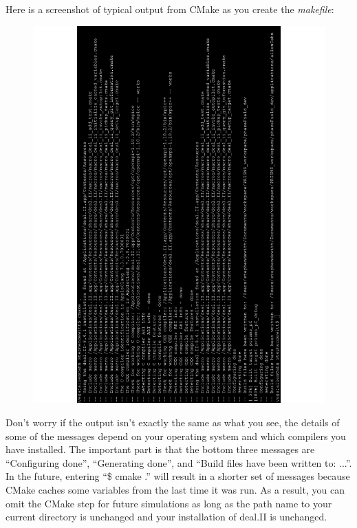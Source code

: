 \documentclass[10pt]{article} %
\begin{document}
Here is a screenshot of typical output from CMake as you create the \emph{makefile}:
\begin{figure}[H]
\vspace{-70pt}
\hspace{-2cm}
\includegraphics[height=1.3\textwidth,trim={0 0 0cm 0cm},clip,angle=-90]{cmake_output_v2}
\vspace{-70pt}
\end{figure}
Don't worry if the output isn't exactly the same as what you see, the details of some of the messages depend on your operating system and which compilers you have installed. The important part is that the bottom three messages are ``Configuring done'', ``Generating done'', and ``Build files have been written to: ...''. In the future, entering ``\$ cmake .'' will result in a shorter set of messages because CMake caches some variables from the last time it was run. As a result, you can omit the CMake step for future simulations as long as the path name to your current directory is unchanged and your installation of deal.II is unchanged.
\end{document}
